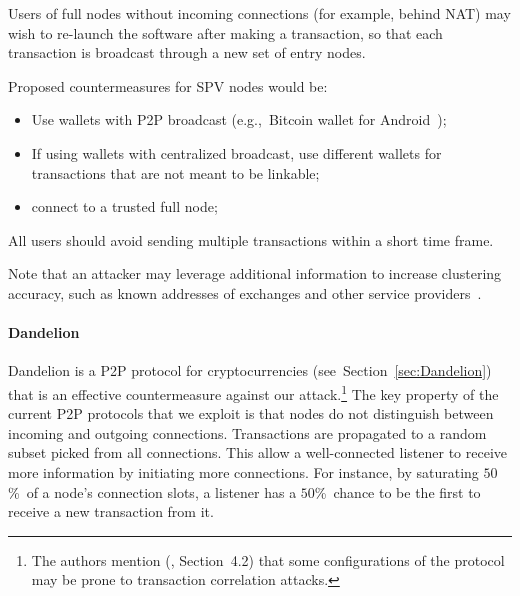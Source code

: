 Users of full nodes without incoming connections (for example, behind NAT) may wish to re-launch the software after making a transaction, so that each transaction is broadcast through a new set of entry nodes.

Proposed countermeasures for SPV nodes would be:

\begin{itemize}
	\item Use wallets with P2P broadcast (e.g.,~Bitcoin wallet for Android~\cite{BitcoinWallet});
	\item If using wallets with centralized broadcast, use different wallets for transactions that are not meant to be linkable;
	\item connect to a trusted full node;
\end{itemize}

All users should avoid sending multiple transactions within a short time frame.

Note that an attacker may leverage additional information to increase clustering accuracy, such as known addresses of exchanges and other service providers~\cite{Walletexplorer}.

\paragraph{Dandelion}
Dandelion is a P2P protocol for cryptocurrencies (see~Section~\ref{sec:Dandelion}) that is an effective countermeasure against our attack.\footnote{The authors mention (\cite{Fanti2018}, Section~4.2) that some configurations of the protocol may be prone to transaction correlation attacks.}
The key property of the current P2P protocols that we exploit is that nodes do not distinguish between incoming and outgoing connections.
Transactions are propagated to a random subset picked from all connections.
This allow a well-connected listener to receive more information by initiating more connections.
For instance, by saturating $50$\%~of a node's connection slots, a listener has a $50$\%~chance to be the first to receive a new transaction from it.

